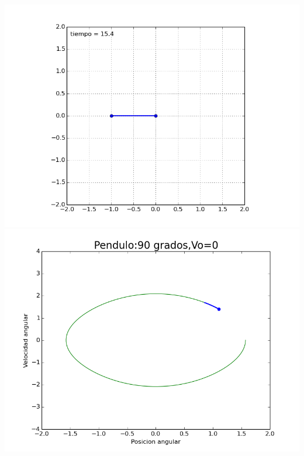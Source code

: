 \documentclass[12pt]{article}
\begin{document}
\begin{center}
\includegraphics[scale=0.5]{90.png}\\
\includegraphics[scale=0.5]{figure_90.png}
\end{center}
\end{document}
